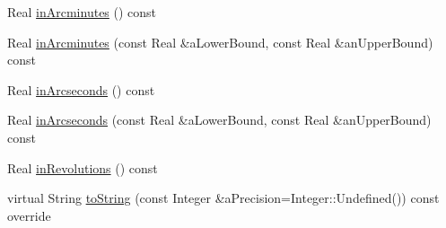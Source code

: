 \begin{DoxyCompactItemize}
\item 
Real \hyperlink{classostk_1_1physics_1_1units_1_1_angle_a03d9c3a133d4076b6a67a0abc8d73271}{in\+Arcminutes} () const
\item 
Real \hyperlink{classostk_1_1physics_1_1units_1_1_angle_a678a42204ee95b335e30853d94b31689}{in\+Arcminutes} (const Real \&a\+Lower\+Bound, const Real \&an\+Upper\+Bound) const
\item 
Real \hyperlink{classostk_1_1physics_1_1units_1_1_angle_ae1898d207b9a0a54bec27a4abfa30db7}{in\+Arcseconds} () const
\item 
Real \hyperlink{classostk_1_1physics_1_1units_1_1_angle_a6ccbfdaeeda6aa1bb812d9bef768fb84}{in\+Arcseconds} (const Real \&a\+Lower\+Bound, const Real \&an\+Upper\+Bound) const
\item 
Real \hyperlink{classostk_1_1physics_1_1units_1_1_angle_a8e0d12ccfb07c08113f9f183272344c8}{in\+Revolutions} () const
\item 
virtual String \hyperlink{classostk_1_1physics_1_1units_1_1_angle_a7403146e01d293dfdd30130f9a9f0f2f}{to\+String} (const Integer \&a\+Precision=Integer\+::\+Undefined()) const override
\end{DoxyCompactItemize}
